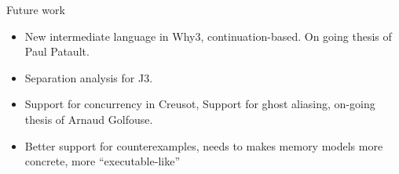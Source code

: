 \documentclass[a4paper,twoside]{article}
\begin{document}
Future work
\begin{itemize}
\item New intermediate language in Why3, continuation-based. On going thesis of
  Paul Patault.
\item Separation analysis for J3.
\item Support for concurrency in Creusot, Support for ghost aliasing, on-going
  thesis of Arnaud Golfouse.
\item Better support for counterexamples, needs to makes memory models more
  concrete, more ``executable-like''
\end{itemize}


%


\end{document}
